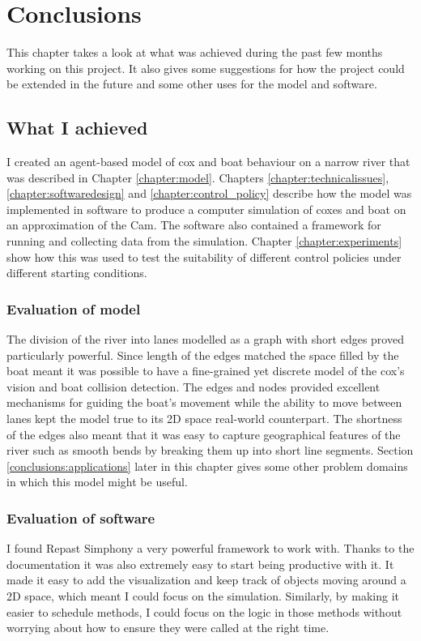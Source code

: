 \chapter{Conclusions}\label{chapter:conclusions}
  This chapter takes a look at what was achieved during the past few months working on this project. It also gives some suggestions for how the project could be extended in the future and some other uses for the model and software.
  
  \section{What I achieved}
  I created an agent-based model of cox and boat behaviour on a narrow river that was described in Chapter \ref{chapter:model}. Chapters \ref{chapter:technicalissues}, \ref{chapter:softwaredesign} and \ref{chapter:control_policy} describe how the model was implemented in software to produce a computer simulation of coxes and boat on an approximation of the Cam. The software also contained a framework for running and collecting data from the simulation. Chapter \ref{chapter:experiments} show how this was used to test the suitability of different control policies under different starting conditions.
  
  \subsection{Evaluation of model}
  The division of the river into lanes modelled as a graph with short edges proved particularly powerful. Since length of the edges matched the space filled by the boat meant it was possible to have a fine-grained yet discrete model of the cox's vision and boat collision detection. The edges and nodes provided excellent mechanisms for guiding the boat's movement while the ability to move between lanes kept the model true to its 2D space real-world counterpart. The shortness of the edges also meant that it was easy to capture geographical features of the river such as smooth bends by breaking them up into short line segments. Section \ref{conclusions:applications} later in this chapter gives some other problem domains in which this model might be useful.
  
  \subsection{Evaluation of software}
  I found Repast Simphony a very powerful framework to work with. Thanks to the documentation it was also extremely easy to start being productive with it. It made it easy to add the visualization and keep track of objects moving around a 2D space, which meant I could focus on the simulation. Similarly, by making it easier to schedule methods, I could focus on the logic in those methods without worrying about how to ensure they were called at the right time.
  
